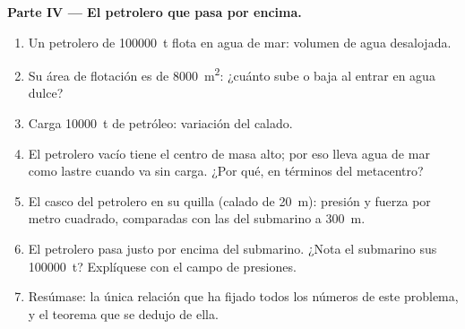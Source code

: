 \begin{problem}
\medskip
\noindent\textbf{Parte IV --- El petrolero que pasa por encima.}
\begin{enumerate}[resume]
  \item Un petrolero de \qty{100000}{t} flota en agua de mar: volumen de
        agua desalojada.
  \item Su área de flotación es de \qty{8000}{m^2}: ¿cuánto sube o baja al
        entrar en agua dulce?
  \item Carga \qty{10000}{t} de petróleo: variación del calado.
  \item El petrolero vacío tiene el centro de masa alto; por eso lleva agua
        de mar como lastre cuando va sin carga. ¿Por qué, en términos del
        metacentro?
  \item El casco del petrolero en su quilla (calado de \qty{20}{m}): presión
        y fuerza por metro cuadrado, comparadas con las del submarino a
        \qty{300}{m}.
  \item El petrolero pasa justo por encima del submarino. ¿Nota el submarino
        sus \qty{100000}{t}? Explíquese con el campo de presiones.
  \item Resúmase: la única relación que ha fijado todos los números de este
        problema, y el teorema que se dedujo de ella.
\end{enumerate}
\end{problem}

